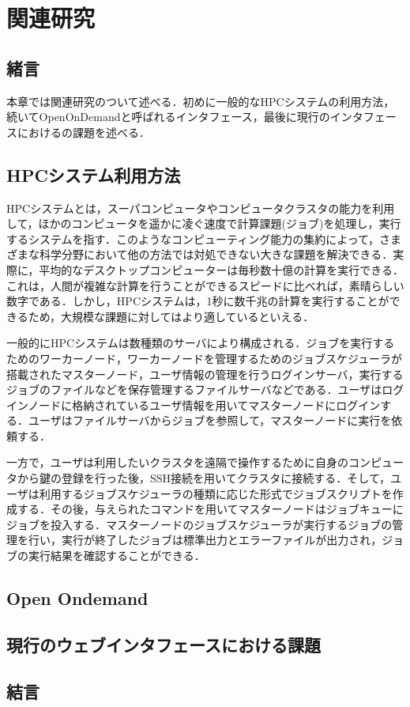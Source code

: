 
\section{関連研究}

\subsection{緒言}
本章では関連研究のついて述べる．初めに一般的なHPCシステムの利用方法，続いてOpenOnDemandと呼ばれるインタフェース，最後に現行のインタフェースにおけるの課題を述べる．

\subsection{HPCシステム利用方法}
HPCシステムとは，スーパコンピュータやコンピュータクラスタの能力を利用して，ほかのコンピュータを遥かに凌ぐ速度で計算課題(ジョブ)を処理し，実行するシステムを指す．このようなコンピューティング能力の集約によって，さまざまな科学分野において他の方法では対処できない大きな課題を解決できる．実際に，平均的なデスクトップコンピューターは毎秒数十億の計算を実行できる．これは，人間が複雑な計算を行うことができるスピードに比べれば，素晴らしい数字である．しかし，HPCシステムは，1秒に数千兆の計算を実行することができるため，大規模な課題に対してはより適しているといえる．\par
一般的にHPCシステムは数種類のサーバにより構成される．ジョブを実行するためのワーカーノード，ワーカーノードを管理するためのジョブスケジューラが搭載されたマスターノード，ユーザ情報の管理を行うログインサーバ，実行するジョブのファイルなどを保存管理するファイルサーバなどである．ユーザはログインノードに格納されているユーザ情報を用いてマスターノードにログインする．ユーザはファイルサーバからジョブを参照して，マスターノードに実行を依頼する．\par
一方で，ユーザは利用したいクラスタを遠隔で操作するために自身のコンピュータから鍵の登録を行った後，SSH接続を用いてクラスタに接続する．そして，ユーザは利用するジョブスケジューラの種類に応じた形式でジョブスクリプトを作成する．その後，与えられたコマンドを用いてマスターノードはジョブキューにジョブを投入する．マスターノードのジョブスケジューラが実行するジョブの管理を行い，実行が終了したジョブは標準出力とエラーファイルが出力され，ジョブの実行結果を確認することができる．\par

\subsection{Open Ondemand}

\subsection{現行のウェブインタフェースにおける課題}

\subsection{結言}
